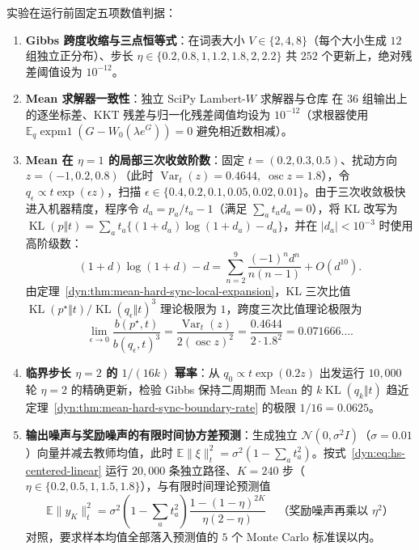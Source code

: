 \documentclass[lang=cn,scheme=chinese,openany]{elegantbook}
\newcommand{\E}{\mathbb E}
\newcommand{\KL}{\operatorname{KL}}
\newcommand{\Var}{\operatorname{Var}}
\begin{document}
实验在运行前固定五项数值判据：
\begin{enumerate}
 \item \textbf{Gibbs 跨度收缩与三点恒等式}：在词表大小 $V\in\{2,4,8\}$（每个大小生成 $12$ 组独立正分布）、步长 $\eta\in\{0.2,0.8,1,1.2,1.8,2,2.2\}$ 共 $252$ 个更新上，绝对残差阈值设为 $10^{-12}$。
 \item \textbf{Mean 求解器一致性}：独立 SciPy Lambert-$W$ 求解器与仓库  在 $36$ 组输出上的逐坐标差、KKT 残差与归一化残差阈值均设为 $10^{-12}$（求根器使用 $\E_q\operatorname{expm1}(G-W_0(\lambda e^G))=0$ 避免相近数相减）。
 \item \textbf{Mean 在 $\eta=1$ 的局部三次收敛阶数}：固定 $t=(0.2,0.3,0.5)$、扰动方向 $z=(-1,0.2,0.8)$（此时 $\Var_t(z)=0.4644,\;\operatorname{osc}z=1.8$），令 $q_\epsilon\propto t\exp(\epsilon z)$，扫描 $\epsilon\in\{0.4,0.2,0.1,0.05,0.02,0.01\}$。由于三次收敛极快进入机器精度，程序令 $d_a=p_a/t_a-1$（满足 $\sum_a t_a d_a=0$），将 KL 改写为 $\KL(p\Vert t)=\sum_a t_a\{(1+d_a)\log(1+d_a)-d_a\}$，并在 $|d_a|<10^{-3}$ 时使用高阶级数：
\begin{equation*}
 (1+d)\log(1+d)-d
 =\sum_{n=2}^{9}\frac{(-1)^n d^n}{n(n-1)}+O(d^{10}).
\end{equation*}
由定理~\ref{dyn:thm:mean-hard-sync-local-expansion}，KL 三次比值 $\KL(p^\star\Vert t)/\KL(q_\epsilon\Vert t)^3$ 理论极限为 $1$，跨度三次比值理论极限为
\begin{equation*}
 \lim_{\epsilon\to 0}\frac{b(p^\star,t)}{b(q_\epsilon,t)^3}=
 \frac{\Var_t(z)}{2(\operatorname{osc}z)^2}=\frac{0.4644}{2\cdot1.8^2}=0.071666\ldots.
\end{equation*}
 \item \textbf{临界步长 $\eta=2$ 的 $1/(16k)$ 幂率}：从 $q_0\propto t\exp(0.2z)$ 出发运行 $10{,}000$ 轮 $\eta=2$ 的精确更新，检验 Gibbs 保持二周期而 Mean 的 $k\KL(q_k\Vert t)$ 趋近定理~\ref{dyn:thm:mean-hard-sync-boundary-rate} 的极限 $1/16=0.0625$。
 \item \textbf{输出噪声与奖励噪声的有限时间协方差预测}：生成独立 $\mathcal N(0,\sigma^2 I)$（$\sigma=0.01$）向量并减去教师均值，此时 $\E\|\xi\|_t^2=\sigma^2(1-\sum_a t_a^2)$。按式~\eqref{dyn:eq:hs-centered-linear} 运行 $20{,}000$ 条独立路径、$K=240$ 步（$\eta\in\{0.2,0.5,1,1.5,1.8\}$），与有限时间理论预测值
\begin{equation*}
 \E\|y_K\|_t^2=
 \sigma^2\left(1-\sum_a t_a^2\right)
 \frac{1-(1-\eta)^{2K}}{\eta(2-\eta)}
 \quad\text{（奖励噪声再乘以 }\eta^2\text{）}
\end{equation*}
对照，要求样本均值全部落入预测值的 $5$ 个 Monte Carlo 标准误以内。
\end{enumerate}
\end{document}
